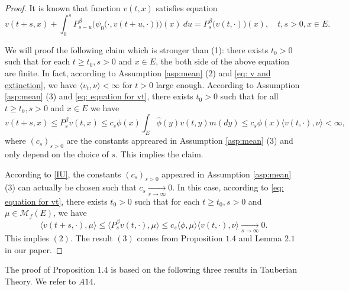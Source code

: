\documentclass[12pt,a4paper]{amsart}
\numberwithin{equation}{section}
\theoremstyle{plain}
\theoremstyle{definition}
\theoremstyle{remark}
\begin{document}
\begin{proof}
It is known that function $v(t,x)$ satisfies equation
\begin{equation}
\label{eq: equation for vt}
	v(t+s,x) + \int_0^sP^\beta_{s-u}\Big(\psi_0\big(\cdot, v(t+u,\cdot)\big)\Big)(x)~du
	=P^\beta_s\big(v(t,\cdot)\big)(x),
	\quad t,s > 0, x\in E.
\end{equation}

	We will proof the following claim which is stronger than (1): there exists $t_0 >0$ such that for each $t\geq t_0, s> 0$ and $x \in E$, the both side of the above equation are finite.
	In fact, according to Assumption \ref{asp:mean} (2) and \eqref{eq: v and extinction}, we have $\langle v_t, \nu\rangle < \infty $ for $t>0$ large enough.
	According to Assumption \ref{asp:mean} (3) and \eqref{eq: equation for vt}, there exists $t_0>0$ such that for all $t \geq t_0,s>0$ and $x\in E$ we have
\begin{equation}
\label{upp}
	v(t+s,x) \leq P^{\beta}_sv(t,x)\leq c_s\phi(x)\int_E\hat\phi(y)v(t,y)m(dy)\leq c_s\phi(x)\langle v(t,\cdot),\nu\rangle< \infty,
\end{equation}
	where $(c_s)_{s>0}$ are the constants appreared in Assumption \ref{asp:mean} (3) and only depend on the choice of $s$.
	This implies the claim.

	According to \eqref{IU}, the constants $(c_s)_{s>0}$ appeared in Assumption \ref{asp:mean} (3) can actually be chosen such that $c_s \xrightarrow[s\to \infty]{} 0$.
	In this case, according to \eqref{eq: equation for vt}, there exists $t_0>0$ such that for each $t \geq t_0, s>0$ and $\mu \in \mathcal M_f(E)$, we have
\[
	\langle v(t +s,\cdot),\mu\rangle
	\leq  \langle P^\beta_sv(t,\cdot),\mu\rangle
	\leq  c_s\langle \phi,\mu\rangle \langle v(t,\cdot), \nu \rangle
	\xrightarrow[s\to \infty]{} 0.
\]
	This implies $(2)$.  The result $(3)$ comes from Proposition $1.4$ and Lemma $2.1$ in our paper.
\end{proof}
The proof of Proposition $1.4$ is based on the following three results in Tauberian Theory.  We refer to \cite{AH} $A14$.
\end{document}
